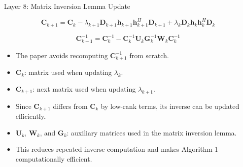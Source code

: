 \documentclass{beamer}
\begin{document}
\begin{frame}{Layer 8: Matrix Inversion Lemma Update}
\scriptsize

\[
\mathbf{C}_{k+1}
=
\mathbf{C}_k
-
\lambda_{k+1}\mathbf{D}_{k+1}\mathbf{h}_{k+1}\mathbf{h}_{k+1}^{H}\mathbf{D}_{k+1}
+
\lambda_k\mathbf{D}_k\mathbf{h}_k\mathbf{h}_k^{H}\mathbf{D}_k
\]

\[
\mathbf{C}_{k+1}^{-1}
=
\mathbf{C}_k^{-1}
-
\mathbf{C}_k^{-1}\mathbf{U}_k
\mathbf{G}_k^{-1}
\mathbf{W}_k
\mathbf{C}_k^{-1}
\]

\begin{itemize}
    \item The paper avoids recomputing \(\mathbf{C}_{k+1}^{-1}\) from scratch.

    \item \(\mathbf{C}_k\): matrix used when updating \(\lambda_k\).

    \item \(\mathbf{C}_{k+1}\): next matrix used when updating \(\lambda_{k+1}\).

    \item Since \(\mathbf{C}_{k+1}\) differs from \(\mathbf{C}_k\) by low-rank terms, its inverse can be updated efficiently.

    \item \(\mathbf{U}_k\), \(\mathbf{W}_k\), and \(\mathbf{G}_k\): auxiliary matrices used in the matrix inversion lemma.

    \item This reduces repeated inverse computation and makes Algorithm 1 computationally efficient.
\end{itemize}

\end{frame}
\end{document}
